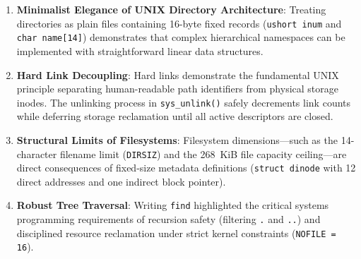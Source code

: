 \documentclass[12pt,a4paper]{article}
\begin{document}
\begin{enumerate}
    \item \textbf{Minimalist Elegance of UNIX Directory Architecture}: Treating directories as plain files containing 16-byte fixed records (\texttt{ushort inum} and \texttt{char name[14]}) demonstrates that complex hierarchical namespaces can be implemented with straightforward linear data structures.
    \item \textbf{Hard Link Decoupling}: Hard links demonstrate the fundamental UNIX principle separating human-readable path identifiers from physical storage inodes. The unlinking process in \texttt{sys\_unlink()} safely decrements link counts while deferring storage reclamation until all active descriptors are closed.
    \item \textbf{Structural Limits of Filesystems}: Filesystem dimensions—such as the 14-character filename limit (\texttt{DIRSIZ}) and the 268~KiB file capacity ceiling—are direct consequences of fixed-size metadata definitions (\texttt{struct dinode} with 12 direct addresses and one indirect block pointer).
    \item \textbf{Robust Tree Traversal}: Writing \texttt{find} highlighted the critical systems programming requirements of recursion safety (filtering \texttt{.} and \texttt{..}) and disciplined resource reclamation under strict kernel constraints (\texttt{NOFILE = 16}).
\end{enumerate}
\end{document}
